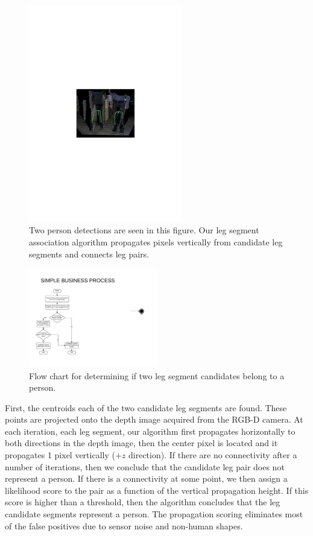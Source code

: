 \documentclass[12pt]{gatech-thesis}
\begin{document}
\begin{figure}[ht!]
\centering
\includegraphics[width=0.6\textwidth]{pics/leg_connectivity}
\caption{Two person detections are seen in this figure. Our leg segment association algorithm propagates pixels vertically from candidate leg segments and connects leg pairs.}
\label{fig:leg_connectivity}
\end{figure}

\begin{figure}[ht!]
\centering
\includegraphics[width=0.5\textwidth]{pics/leg_connectivity_diagram}
\caption{Flow chart for determining if two leg segment candidates belong to a person.}
\label{fig:leg_connectivity_diagram}
\end{figure}

First, the centroids each of the two candidate leg segments are found.  These points are projected onto the depth image acquired from the RGB-D camera. At each iteration, each leg segment, our algorithm first propagates horizontally to both directions in the depth image, then the center pixel is located and it propagates 1 pixel vertically ($+z$ direction). If there are no connectivity after a number of iterations, then we conclude that the candidate leg pair does not represent a person. If there is a connectivity at some point, we then assign a likelihood score to the pair as a function of the vertical propagation height. If this score is higher than a threshold, then the algorithm concludes that the leg candidate segments represent a person. The propagation scoring eliminates most of the false positives due to sensor noise and non-human shapes.
\end{document}

